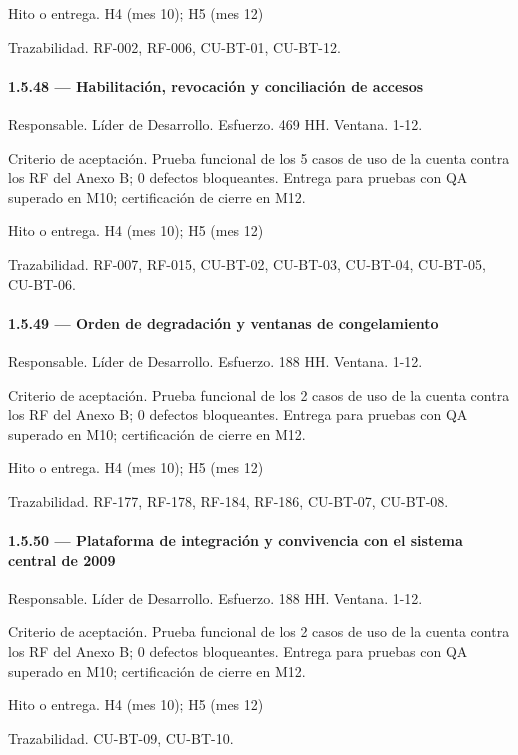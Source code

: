 \documentclass[11pt]{article}
\begin{document}
Hito o entrega. H4 (mes 10); H5 (mes 12)

Trazabilidad. RF-002, RF-006, CU-BT-01, CU-BT-12.

\paragraph{1.5.48 — Habilitación, revocación y conciliación de accesos}

Responsable. Líder de Desarrollo. Esfuerzo. 469 HH. Ventana. 1-12.

Criterio de aceptación. Prueba funcional de los 5 casos de uso de la cuenta contra los RF del Anexo B; 0 defectos bloqueantes. Entrega para pruebas con QA superado en M10; certificación de cierre en M12.

Hito o entrega. H4 (mes 10); H5 (mes 12)

Trazabilidad. RF-007, RF-015, CU-BT-02, CU-BT-03, CU-BT-04, CU-BT-05, CU-BT-06.

\paragraph{1.5.49 — Orden de degradación y ventanas de congelamiento}

Responsable. Líder de Desarrollo. Esfuerzo. 188 HH. Ventana. 1-12.

Criterio de aceptación. Prueba funcional de los 2 casos de uso de la cuenta contra los RF del Anexo B; 0 defectos bloqueantes. Entrega para pruebas con QA superado en M10; certificación de cierre en M12.

Hito o entrega. H4 (mes 10); H5 (mes 12)

Trazabilidad. RF-177, RF-178, RF-184, RF-186, CU-BT-07, CU-BT-08.

\paragraph{1.5.50 — Plataforma de integración y convivencia con el sistema central de 2009}

Responsable. Líder de Desarrollo. Esfuerzo. 188 HH. Ventana. 1-12.

Criterio de aceptación. Prueba funcional de los 2 casos de uso de la cuenta contra los RF del Anexo B; 0 defectos bloqueantes. Entrega para pruebas con QA superado en M10; certificación de cierre en M12.

Hito o entrega. H4 (mes 10); H5 (mes 12)

Trazabilidad. CU-BT-09, CU-BT-10.
\end{document}
